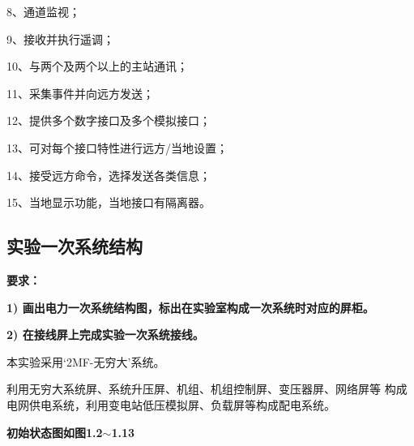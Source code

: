 \documentclass[a4paper]{ctexrep}
\begin{document}
                    8、通道监视； 
                    
                    9、接收并执行遥调； 
                    
                    10、与两个及两个以上的主站通讯； 
                    
                    11、采集事件并向远方发送； 
                    
                    12、提供多个数字接口及多个模拟接口； 
                    
                    13、可对每个接口特性进行远方/当地设置； 
                    
                    14、接受远方命令，选择发送各类信息； 
                    
                    15、当地显示功能，当地接口有隔离器。

                \subsection{实验一次系统结构}
                    \textbf{要求：}
                    
                    \textbf{1) 画出电力一次系统结构图，标出在实验室构成一次系统时对应的屏柜。}
                    
                    \textbf{2) 在接线屏上完成实验一次系统接线。} 

                    本实验采用‘2MF-无穷大’系统。
                    
                    利用无穷大系统屏、系统升压屏、机组、机组控制屏、变压器屏、网络屏等 构成电网供电系统，利用变电站低压模拟屏、负载屏等构成配电系统。 
                    
                    \textbf{初始状态图如图1.2$\sim$1.13}
\end{document}
